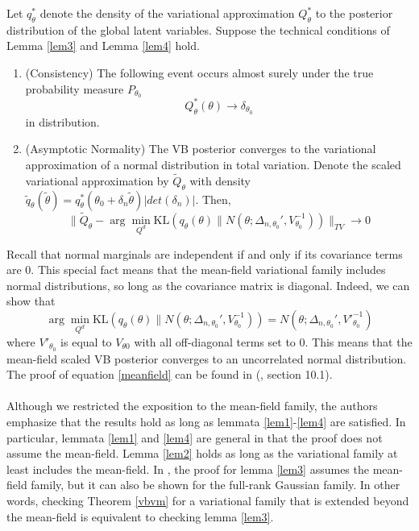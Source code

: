 \begin{theorem}
	\label{vbvm}
	Let $q^*_{\theta}$ denote the density of the variational approximation $Q^*_{\theta}$ to the posterior distribution of the global latent variables. Suppose the technical conditions of Lemma \ref{lem3} and Lemma \ref{lem4} hold. 
	\begin{enumerate}
		\item (Consistency) The following event occurs almost surely under the true probability measure $P_{\theta_0}$
		\begin{equation*}
		Q^*_{\theta}(\theta) \to \delta_{\theta_0}
		\end{equation*}
		in distribution. 
		\item (Asymptotic Normality) The VB posterior converges to the variational approximation of a normal distribution in total variation. Denote the scaled variational approximation by $\tilde{Q}_{\theta}$ with density $\tilde{q}_{\theta}(\tilde{\theta}) = q^*_{\theta}(\theta_0 + \delta_n\tilde{\theta}) |det(\delta_n)|$. Then, 
		\begin{equation*}
		\| \tilde{Q}_{\theta}  -
		\arg\min_{Q^d} \text{KL}(q_{\theta}(\theta)\| N(\theta; \Delta_{n, \theta_0}', V^{-1}_{\theta_0}))\|_{TV} \to 0
		\end{equation*}
	\end{enumerate}
\end{theorem}
	Recall that normal marginals are independent if and only if its covariance terms are 0. This special fact means that the mean-field variational family includes normal distributions, so long as the covariance matrix is diagonal. Indeed, we can show that
	\begin{equation}
	\label{meanfield}
	\arg\min_{Q^d} \text{KL}(q_{\theta}(\theta)\| N(\theta; \Delta_{n, \theta_0}', V^{-1}_{\theta_0})) = N(\theta; \Delta_{n, \theta_0}', V'^{-1}_{\theta_0})
	\end{equation}
	where $V'_{\theta_0}$ is equal to $V_{\theta0}$ with all off-diagonal terms set to 0. This means that the mean-field scaled VB posterior converges to an uncorrelated normal distribution. The proof of equation \ref{meanfield} can be found in (\cite{Bishop::2006}, section 10.1). 
	
	\paragraph{}Although we restricted the exposition to the mean-field family, the authors emphasize that the results hold as long as lemmata \ref{lem1}-\ref{lem4} are satisfied. In particular, lemmata \ref{lem1} and \ref{lem4} are general in that the proof does not assume the mean-field. Lemma \ref{lem2} holds as long as the variational family at least includes the mean-field. In \cite{Wang:2019:VBVM}, the proof for lemma \ref{lem3} assumes the mean-field family, but it can also be shown for the full-rank Gaussian family. In other words, checking Theorem \ref{vbvm} for a variational family that is extended beyond the mean-field is equivalent to checking lemma \ref{lem3}. 
	

